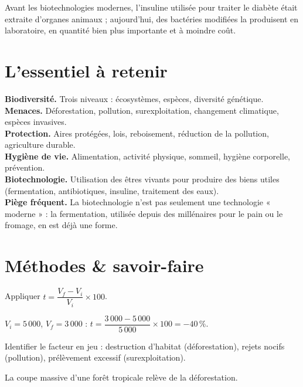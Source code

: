 \begin{exemple}
Avant les biotechnologies modernes, l'insuline utilisée pour traiter le diabète était
extraite d'organes animaux ; aujourd'hui, des bactéries modifiées la produisent en
laboratoire, en quantité bien plus importante et à moindre coût.
\end{exemple}

\section{L'essentiel à retenir}

\begin{synthese}
\textbf{Biodiversité.} Trois niveaux : écosystèmes, espèces, diversité génétique.\\[4pt]
\textbf{Menaces.} Déforestation, pollution, surexploitation, changement climatique,
espèces invasives.\\[4pt]
\textbf{Protection.} Aires protégées, lois, reboisement, réduction de la pollution,
agriculture durable.\\[4pt]
\textbf{Hygiène de vie.} Alimentation, activité physique, sommeil, hygiène corporelle,
prévention.\\[4pt]
\textbf{Biotechnologie.} Utilisation des êtres vivants pour produire des biens utiles
(fermentation, antibiotiques, insuline, traitement des eaux).\\[4pt]
\textbf{Piège fréquent.} La biotechnologie n'est pas seulement une technologie
« moderne » : la fermentation, utilisée depuis des millénaires pour le pain ou le
fromage, en est déjà une forme.
\end{synthese}

\section{Méthodes \& savoir-faire}

Appliquer $t=\dfrac{V_f-V_i}{V_i}\times100$.
\begin{exemple}
$V_i=5\,000$, $V_f=3\,000$ : $t=\dfrac{3\,000-5\,000}{5\,000}\times100=-40\,\%$.
\end{exemple}

Identifier le facteur en jeu : destruction d'habitat (déforestation), rejets nocifs
(pollution), prélèvement excessif (surexploitation).
\begin{exemple}
La coupe massive d'une forêt tropicale relève de la déforestation.
\end{exemple}

